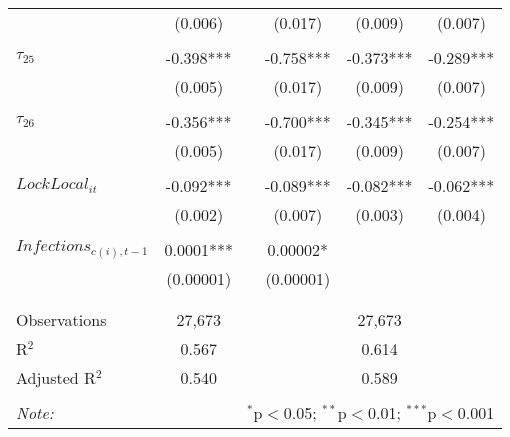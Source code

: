 \begin{tabular}{@{\extracolsep{-5pt}}lccccc}
                &  (0.006)  &&  (0.017)  &  (0.009)  &  (0.007)  \\
                &           &&           &           &           \\[-2.1ex]
$\tau_{25}$     & -0.398*** && -0.758*** & -0.373*** & -0.289*** \\
                &  (0.005)  &&  (0.017)  &  (0.009)  &  (0.007)  \\
                &           &&           &           &           \\[-2.1ex]
$\tau_{26}$     & -0.356*** && -0.700*** & -0.345*** & -0.254*** \\
                &  (0.005)  &&  (0.017)  &  (0.009)  &  (0.007)  \\
                &           &&           &           &           \\[-1.ex]
$LockLocal_{it}$ & -0.092*** && -0.089*** & -0.082*** & -0.062*** \\
                 &  (0.002)  &&  (0.007)  &  (0.003)  &  (0.004)  \\
                 &           &&           &           &           \\[-1.1ex]
$Infections _{c(i),t-1}$ & 0.0001*** &&  0.00002* &           &           \\
                         & (0.00001) && (0.00001) &           &           \\
                         &           &&           &           &           \\[-2.1ex]

\hline \\[-1.8ex] 
Observations     & 27,673 && \multicolumn{3}{c}{27,673} \\ 
R$^{2}$          &  0.567 && \multicolumn{3}{c}{0.614 } \\ 
Adjusted R$^{2}$ &  0.540 && \multicolumn{3}{c}{0.589 } \\ 
\hline 
\hline \\[-1.8ex] 
\textit{Note:}  & \multicolumn{5}{r}{$^{*}$p$<$0.05; $^{**}$p$<$0.01; $^{***}$p$<$0.001} \\ 
\end{tabular} 